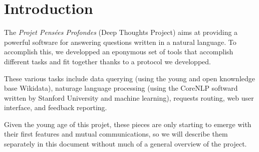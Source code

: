\chapter{Introduction}

The {\em Projet Pensées Profondes} (Deep Thoughts Project) aims at
providing a powerful software for answering questions written in a
natural language.
To accomplish this, we developped an eponymous set of tools that
accomplish different tasks and fit together thanks to a protocol
we developped.

These various tasks include data querying (using the young and open
knownledge base Wikidata), naturage language processing (using the
CoreNLP softward written by Stanford University and machine learning),
requests routing, web user interface, and feedback reporting.

Given the young age of this projet, these pieces are only starting
to emerge with their first features and mutual communications,
so we will describe them separately in this document without
much of a general overview of the project.
